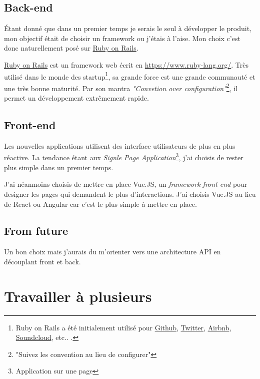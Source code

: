 \documentclass[]{report}
\begin{document}
    \subsection{Back-end}

      Étant donné que dans un premier temps je serais le seul à développer le produit, mon objectif était de choisir un framework ou j'étais à l'aise. Mon choix c'est donc naturellement posé sur \href{https://rubyonrails.org/}{Ruby on Rails}.

      \href{https://rubyonrails.org/}{Ruby on Rails} est un framework web écrit en \href{Ruby}{https://www.ruby-lang.org/}. Très utilisé dans le monde des startup\footnote{ Ruby on Rails a été initialement utilisé pour \href{https://github.com/}{Github}, \href{https://twitter.com/}{Twitter}, \href{https://airbnb.com/}{Airbnb}, \href{https://soundcloud.com/}{Soundcloud}, etc.. .}, sa grande force est une grande communauté et une très bonne maturité. Par son mantra \textit{"Convetion over configuration"}\footnote{"Suivez les convention au lieu de configurer"}, il permet un développement extrêmement rapide.

    \subsection{Front-end}

      Les nouvelles applications utilisent des interface utilisateurs de plus en plus réactive. La tendance étant aux \textit{Signle Page Application}\footnote{Application sur une page}, j'ai choisis de rester plus simple dans un premier temps.

      J'ai néanmoins choisis de mettre en place Vue.JS, un \textit{framework front-end} pour designer les pages qui demandent le plus d’interactions. J'ai choisis Vue.JS au lieu de React ou Angular car c'est le plus simple à mettre en place.

    \subsection{From future}

      Un bon choix mais j'aurais du m'orienter vers une architecture API en découplant front et back.


  \section{Travailler à plusieurs}\label{sec:git}
\end{document}

